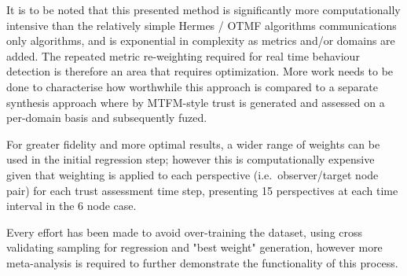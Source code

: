 It is to be noted that this presented method is significantly more computationally intensive than the relatively simple Hermes / OTMF algorithms communications only algorithms, and is exponential in complexity as metrics and/or domains are added. The repeated metric re-weighting required for real time behaviour detection is therefore an area that requires optimization. More work needs to be done to characterise how worthwhile this approach is compared to a separate synthesis approach where by MTFM-style trust is generated and assessed on a per-domain basis and subsequently fuzed.

For greater fidelity and more optimal results, a wider range of weights can be used in the initial regression step; however this is computationally expensive given that weighting is applied to each perspective (i.e.\ observer/target node pair) for each trust assessment time step, presenting 15 perspectives at each time interval in the 6 node case.

Every effort has been made to avoid over-training the dataset, using cross validating sampling for regression and "best weight" generation, however more meta-analysis is required to further demonstrate the functionality of this process.



\ifx\ifthesis\undefined
	
\else
\fi
